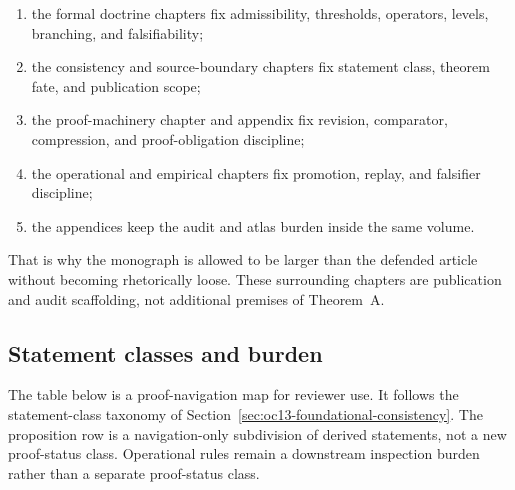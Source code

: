 \begin{enumerate}
\item the formal doctrine chapters fix admissibility, thresholds, operators,
      levels, branching, and falsifiability;
\item the consistency and source-boundary chapters fix statement class,
      theorem fate, and publication scope;
\item the proof-machinery chapter and appendix fix revision, comparator,
      compression, and proof-obligation discipline;
\item the operational and empirical chapters fix promotion, replay, and
      falsifier discipline;
\item the appendices keep the audit and atlas burden inside the same volume.
\end{enumerate}

That is why the monograph is allowed to be larger than the defended article
without becoming rhetorically loose. These surrounding chapters are publication
and audit scaffolding, not additional premises of Theorem~A.

\subsection{Statement classes and burden}

The table below is a proof-navigation map for reviewer use. It follows the
statement-class taxonomy of Section~\ref{sec:oc13-foundational-consistency}.
The proposition row is a navigation-only subdivision of derived statements,
not a new proof-status class. Operational rules remain a downstream inspection
burden rather than a separate proof-status class.

